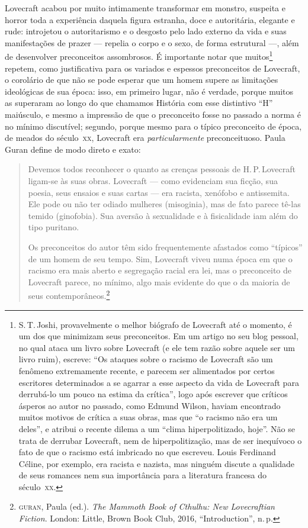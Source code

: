 Lovecraft acabou por muito intimamente transformar em monstro, suspeita
e horror toda a experiência daquela figura estranha, doce e autoritária,
elegante e rude: introjetou o autoritarismo e o desgosto pelo lado
externo da vida e suas manifestações de prazer --- repelia o
corpo e o sexo, de forma estrutural ---, além de
desenvolver preconceitos assombrosos. É importante notar que
muitos\footnote{S.\,T.\,Joshi, provavelmente o melhor biógrafo de
  Lovecraft até o momento, é um dos que minimizam seus preconceitos. Em
  um artigo no seu blog pessoal, no qual ataca um livro sobre Lovecraft
  (e ele tem razão sobre aquele ser um livro ruim), escreve: ``Os ataques
  sobre o racismo de Lovecraft são um fenômeno extremamente recente, e
  parecem ser alimentados por certos escritores determinados a se
  agarrar a esse aspecto da vida de Lovecraft para derrubá-lo um pouco
  na estima da crítica'', logo após escrever que críticos ásperos ao
  autor no passado, como Edmund Wilson, haviam encontrado muitos motivos
  de crítica a suas obras, mas que ``o racismo não era um deles'', e
  atribui o recente dilema a um ``clima hiperpolitizado, hoje''. Não se
  trata de derrubar Lovecraft, nem de hiperpolitização, mas de ser
  inequívoco o fato de que o racismo está imbricado no que escreveu.
  Louis Ferdinand Céline, por exemplo, era racista e nazista, mas
  ninguém discute a qualidade de seus romances nem sua importância para
  a literatura francesa do século~\textsc{xx}.} repetem, como justificativa para
os variados e espessos preconceitos de Lovecraft, o corolário de que não
se pode esperar que um homem supere as limitações ideológicas de sua
época: isso, em primeiro lugar, não é verdade, porque muitos as
superaram ao longo do que chamamos História com esse distintivo ``H''
maiúsculo, e mesmo a impressão de que o preconceito fosse no passado a
norma é no mínimo discutível; segundo, porque mesmo para o típico
preconceito de época, de meados do século~\textsc{xx}, Lovecraft era
\emph{particularmente} preconceituoso. Paula Guran define de modo direto
e exato:

\begin{quote}
Devemos todos reconhecer o quanto as crenças pessoais de H.\,P.\,Lovecraft
ligam-se às suas obras. Lovecraft --- como evidenciam sua ficção,
sua poesia, seus ensaios e suas cartas --- era racista, xenófobo e
antissemita. Ele pode ou não ter odiado mulheres (misoginia), mas de
fato parece tê-las temido (ginofobia). Sua aversão à sexualidade e à
fisicalidade iam além do tipo puritano.

Os preconceitos do autor têm sido frequentemente afastados como
``típicos'' de um homem de seu tempo. Sim, Lovecraft viveu numa época em
que o racismo era mais aberto e segregação racial era lei, mas o
preconceito de Lovecraft parece, no mínimo, algo mais evidente do que o
da maioria de seus contemporâneos.\footnote{\textsc{guran}, Paula (ed.).
  \emph{The Mammoth Book of Cthulhu: New Lovecraftian Fiction}. London:
  Little, Brown Book Club, 2016, ``Introduction'', n.\,p.}
\end{quote}

